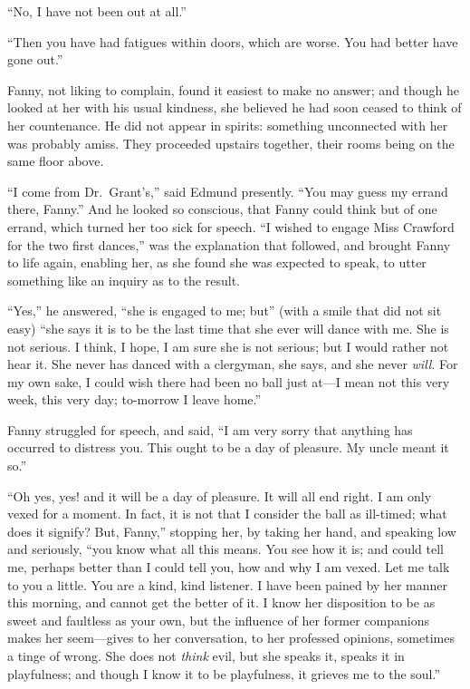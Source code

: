 \documentclass{article}
\begin{document}
``No, I have not been out at all.''

``Then you have had fatigues within doors, which are worse.
You had better have gone out.''

Fanny, not liking to complain, found it easiest to make
no answer; and though he looked at her with his usual kindness,
she believed he had soon ceased to think of her countenance.
He did not appear in spirits:  something unconnected with
her was probably amiss.  They proceeded upstairs together,
their rooms being on the same floor above.

``I come from Dr.\ Grant's,'' said Edmund presently.
``You may guess my errand there, Fanny.''  And he looked
so conscious, that Fanny could think but of one errand,
which turned her too sick for speech.  ``I wished to
engage Miss Crawford for the two first dances,'' was the
explanation that followed, and brought Fanny to life again,
enabling her, as she found she was expected to speak,
to utter something like an inquiry as to the result.

``Yes,'' he answered, ``she is engaged to me; but'' (with a smile
that did not sit easy) ``she says it is to be the last time
that she ever will dance with me.  She is not serious.
I think, I hope, I am sure she is not serious; but I would
rather not hear it.  She never has danced with a clergyman,
she says, and she never \emph{will}.  For my own sake, I could
wish there had been no ball just at---I mean not this
very week, this very day; to-morrow I leave home.''

Fanny struggled for speech, and said, ``I am very sorry
that anything has occurred to distress you.  This ought
to be a day of pleasure.  My uncle meant it so.''

``Oh yes, yes! and it will be a day of pleasure.
It will all end right.  I am only vexed for a moment.
In fact, it is not that I consider the ball as ill-timed;
what does it signify?  But, Fanny,'' stopping her,
by taking her hand, and speaking low and seriously,
``you know what all this means.  You see how it is;
and could tell me, perhaps better than I could tell you,
how and why I am vexed.  Let me talk to you a little.
You are a kind, kind listener.  I have been pained
by her manner this morning, and cannot get the better
of it.  I know her disposition to be as sweet and
faultless as your own, but the influence of her former
companions makes her seem---gives to her conversation,
to her professed opinions, sometimes a tinge of wrong.
She does not \emph{think} evil, but she speaks it, speaks it
in playfulness; and though I know it to be playfulness,
it grieves me to the soul.''
\end{document}
